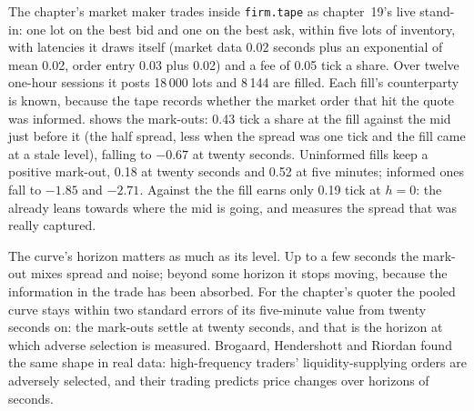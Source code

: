 The chapter's market maker trades inside \texttt{firm.tape} as chapter~19's live stand-in: one lot on the best bid and one on the best ask, within five lots
of inventory, with latencies it draws itself (market data 0.02 seconds plus an exponential of mean 0.02, order entry 0.03 plus 0.02) and a fee of 0.05 tick a
share. Over twelve one-hour sessions it posts 18\,000 lots and 8\,144 are filled. Each fill's counterparty is known, because the tape records whether the
market order that hit the quote was informed.  shows the mark-outs: 0.43 tick a share at the fill
against the mid just before it (the half spread, less when the spread was one tick and the fill came at a stale level), falling to $-0.67$ at twenty seconds.
Uninformed fills keep a positive mark-out, 0.18 at twenty seconds and 0.52 at five minutes; informed ones fall to $-1.85$ and $-2.71$. Against the 
the fill earns only 0.19 tick at $h = 0$: the  already leans towards where the mid is going, and measures the spread that was really captured.

The curve's horizon matters as much as its level. Up to a few seconds the mark-out mixes spread and noise; beyond some horizon it stops moving, because the
information in the trade has been absorbed. For the chapter's quoter the pooled curve stays within two standard errors of its five-minute value from twenty
seconds on: the mark-outs settle at twenty seconds, and that is the horizon at which adverse selection is measured. Brogaard, Hendershott and Riordan found the
same shape in real data: high-frequency traders' liquidity-supplying orders are adversely selected, and their trading predicts price changes over horizons of
seconds.

